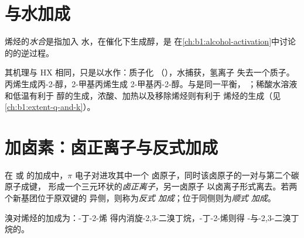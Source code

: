 \section{与水加成}

\begin{definition}[烯烃的水合]\label{def:b1:electrophilic-additions:hydration}
烯烃的\emph{水合}是指加入
水，在催化下生成醇，是
在\cref{ch:b1:alcohol-activation}中讨论的的逆过程。
\end{definition}

其机理与 HX 相同，只是以水作：质子化
（），水捕获，氢离子
失去一个质子。丙烯生成丙-2-醇，2-甲基丙烯生成
2-甲基丙-2-醇。与是同一平衡，
；稀酸水溶液和低温有利于
醇的生成，浓酸、加热以及移除烯烃则有利于
烯烃的生成（见\cref{ch:b1:extent-q-and-k}）。

\section{加卤素：卤正离子与反式加成}

\begin{definition}\label{def:b1:electrophilic-additions:halonium}
在  或  的加成中，$\pi$ 电子对进攻其中一个
卤原子，同时该卤原子的一对与第二个碳原子成键，
形成一个三元环状的\emph{卤正离子}，另一卤原子
以卤离子形式离去。若两个新基团位于原双键的
异侧，则称为\emph{反式
加成}；位于同侧则为\emph{顺式
加成}。
\end{definition}

\begin{proposition}[卤素加成为反式]\label{prop:b1:electrophilic-additions:anti-addition}
溴对烯烃的加成为：-丁-2-烯
得内消旋-2,3-二溴丁烷，-丁-2-烯则得
-与-2,3-二溴丁烷的。
\end{proposition}

